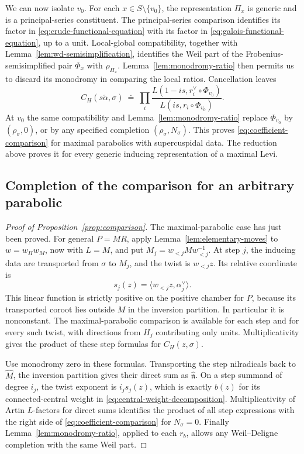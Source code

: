 We can now isolate $v_0$.  For each $x\in S\setminus\{v_0\}$, the
representation $\Pi_x$ is generic and is a principal-series
constituent.  The principal-series comparison identifies its
factor in \eqref{eq:crude-functional-equation} with its factor in
\eqref{eq:galois-functional-equation}, up to a unit.  Local-global
compatibility, together with Lemma~\ref{lem:wd-semisimplification},
identifies the Weil part of the Frobenius-semisimplified pair $\Phi_x$
with $\rho_{\Pi_x}$.  Lemma~\ref{lem:monodromy-ratio} then permits
us to discard its monodromy in comparing the local ratios.
Cancellation leaves
\[
 C_H(s\widetilde\alpha,\sigma)
   \ \doteq\
   \prod_i
   \frac{L(1-is,r_i^\vee\circ\Phi_{v_0})}
        {L(is,r_i\circ\Phi_{v_0})}.
\]
At $v_0$ the same compatibility and
Lemma~\ref{lem:monodromy-ratio} replace $\Phi_{v_0}$ by
$(\rho_\sigma,0)$, or by any specified completion
$(\rho_\sigma,N_\sigma)$.  This proves
\eqref{eq:coefficient-comparison} for maximal parabolics with
supercuspidal data.  The reduction above proves it for every
generic inducing representation of a maximal Levi.

\subsection{Completion of the comparison for an arbitrary parabolic}

\begin{proof}[Proof of Proposition~\ref{prop:comparison}]
The maximal-parabolic case has just been proved.  For general $P=MR$,
apply Lemma~\ref{lem:elementary-moves} to $w=w_Hw_M$, now with
$L=M$, and put $M_j=w_{<j}Mw_{<j}^{-1}$.  At step $j$, the inducing data are transported from
$\sigma$ to $M_j$, and the twist is $w_{<j}z$.  Its relative
coordinate is
\[
 s_j(z)=\langle w_{<j}z,\alpha_j^\vee\rangle.
\]
This linear function is strictly positive on the positive chamber
for $P$, because its transported coroot lies outside $M$ in the
inversion partition.  In particular it is nonconstant.
The maximal-parabolic comparison is available for each step and
for every such twist, with directions from $H_j$ contributing
only units.  Multiplicativity gives the product of these step
formulas for $C_H(z,\sigma)$.

Use monodromy zero in these formulas.  Transporting the step
nilradicals back to $\widehat M$, the inversion partition gives
their direct sum as $\widehat{\mathfrak n}$.  On a step summand
of degree $i_j$, the twist exponent is $i_js_j(z)$, which is
exactly $b(z)$ for its connected-central weight in
\eqref{eq:central-weight-decomposition}.  Multiplicativity of
Artin $L$-factors for direct sums identifies the product of all
step expressions with the right side of
\eqref{eq:coefficient-comparison} for $N_\sigma=0$.
Finally Lemma~\ref{lem:monodromy-ratio}, applied to each $r_b$,
allows any Weil--Deligne completion with the same Weil part.
\end{proof}
